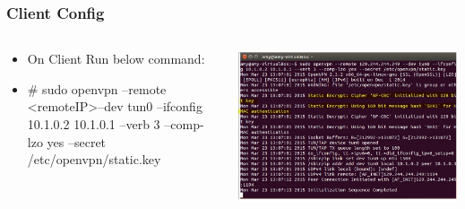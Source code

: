 \documentclass{beamer}
\begin{document}
\begin{frame}
\frametitle{Client Config}
\begin{columns}
    \begin{column}{0.48\textwidth}
        \begin{itemize}
	\item On Client Run below command:\\
	\item \# sudo openvpn --remote \textless remoteIP\textgreater  --dev tun0 --ifconfig 10.1.0.2 10.1.0.1 --verb 3 --comp-lzo yes --secret /etc/openvpn/static.key
        \end{itemize}
    \end{column}
    \begin{column}{.5\textwidth}
        \includegraphics[width=.9\linewidth]{am2}
    \end{column}
\end{columns}
\end{frame}
\end{document}
